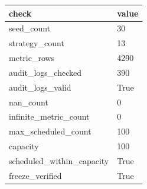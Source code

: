 \begin{tabular}{l l}
\hline
check & value \\
\hline
seed\_count & 30 \\
strategy\_count & 13 \\
metric\_rows & 4290 \\
audit\_logs\_checked & 390 \\
audit\_logs\_valid & True \\
nan\_count & 0 \\
infinite\_metric\_count & 0 \\
max\_scheduled\_count & 100 \\
capacity & 100 \\
scheduled\_within\_capacity & True \\
freeze\_verified & True \\
\hline
\end{tabular}
